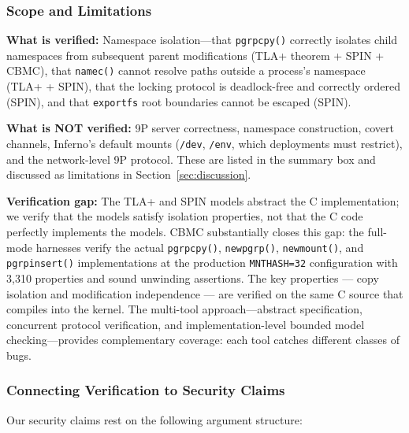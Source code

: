 \documentclass[acmsmall,screen,review]{acmart}
\begin{document}
\subsubsection{Scope and Limitations}

\textbf{What is verified:} Namespace isolation---that \texttt{pgrpcpy()} correctly
isolates child namespaces from subsequent parent modifications (TLA+ theorem +
SPIN + CBMC), that \texttt{namec()} cannot resolve paths outside a process's namespace
(TLA+ + SPIN), that the locking protocol is deadlock-free and correctly ordered (SPIN),
and that \texttt{exportfs} root boundaries cannot be escaped (SPIN).

\textbf{What is NOT verified:} 9P server correctness, namespace construction, covert channels, Inferno's default mounts (\texttt{/dev}, \texttt{/env}, which deployments must restrict), and the network-level 9P protocol. These are listed in the summary box and discussed as limitations in Section~\ref{sec:discussion}.

\textbf{Verification gap:} The TLA+ and SPIN models abstract the C implementation;
we verify that the models satisfy isolation properties, not that the C code perfectly
implements the models. CBMC substantially closes this gap: the full-mode harnesses
verify the actual \texttt{pgrpcpy()}, \texttt{newpgrp()}, \texttt{newmount()}, and
\texttt{pgrpinsert()} implementations at the production \texttt{MNTHASH=32}
configuration with 3,310 properties and sound unwinding assertions. The key properties
--- copy isolation and modification independence --- are verified on the same C source
that compiles into the kernel. The multi-tool approach---abstract specification,
concurrent protocol verification, and implementation-level bounded model checking---provides
complementary coverage: each tool catches different classes of bugs.

\subsubsection{Connecting Verification to Security Claims}

Our security claims rest on the following argument structure:
\end{document}
